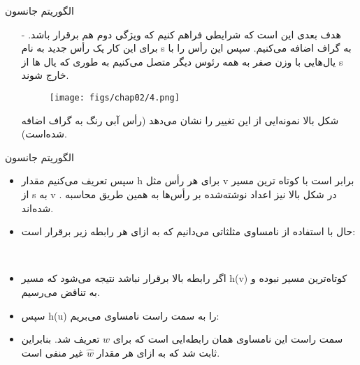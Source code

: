 \begin{frame}{الگوریتم جانسون}
	\begin{itemize}\itemr
		\item[-]
هدف بعدی این است که شرایطی فراهم کنیم که ویژگی دوم هم برقرار باشد. برای این کار یک رأس جدید به نام s به گراف اضافه می‌کنیم. سپس این رأس را با یال‌هایی با وزن صفر به همه رئوس دیگر متصل می‌کنیم به طوری که یال ‌ها از s خارج شوند.
		\begin{figure}[h!]
			\centering
			\texttt{[image: figs/chap02/4.png]}
		\end{figure}
شکل بالا نمونه‌ایی از این تغییر را نشان می‌دهد (رأس آبی رنگ به گراف اضافه شده‌است).
	\end{itemize}
\end{frame}

\begin{frame}{الگوریتم جانسون}
	\begin{itemize}\itemr
		\item
سپس تعریف می‌کنیم مقدار h برای هر رأس مثل v برابر است با کوتاه ترین مسیر از s به v . در شکل بالا نیز اعداد نوشته‌شده بر رأس‌ها به همین طریق محاسبه شده‌اند.
		\item
حال با استفاده از نامساوی مثلثاتی می‌دانیم که به ازای هر
رابطه زیر برقرار است:
		\begin{center}
			 \\

		\end{center}
		\item
اگر رابطه بالا برقرار نباشد نتیجه می‌شود که مسیر h(v) کوتاه‌ترین مسیر نبوده و به تناقض می‌رسیم.
		\item
سپس h(u) را به سمت راست نامساوی می‌بریم:
		\begin{center}
		\end{center}
		\item
سمت راست این نامساوی همان رابطه‌ایی است که برای $\hat{w}$ تعریف شد. بنابراین ثابت شد که به ازای هر
مقدار $\hat{w}$ غیر منفی است.
	\end{itemize}
\end{frame}

